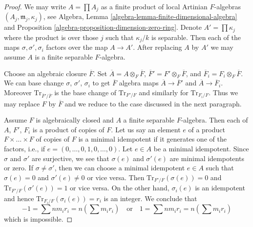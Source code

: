 \documentclass[10pt,a4paper]{amsart}
\theoremstyle{plain}
\theoremstyle{definition}
\theoremstyle{remark}
\numberwithin{equation}{subsection}
\begin{document}
\begin{proof}
We may write $A = \prod A_j$ as a finite product of
local Artinian $F$-algebras $(A_j, \mathfrak m_j, \kappa_j)$, see
Algebra, Lemma \ref{algebra-lemma-finite-dimensional-algebra} and
Proposition \ref{algebra-proposition-dimension-zero-ring}.
Denote $A' = \prod \kappa_j$ where the product is over those $j$
such that $\kappa_j/k$ is separable. Then each of the maps
$\sigma, \sigma', \sigma_i$ factors over the map
$A \to A'$. After replacing $A$ by $A'$ we may assume
$A$ is a finite separable $F$-algebra.

\medskip\noindent
Choose an algebraic closure $\overline{F}$. Set
$\overline{A} = A \otimes_F \overline{F}$,
$\overline{F}' = F' \otimes_F \overline{F}$, and
$\overline{F}_i = F_i \otimes_F \overline{F}$.
We can base change $\sigma$, $\sigma'$, $\sigma_i$
to get $\overline{F}$ algebra maps $\overline{A} \to \overline{F}'$
and $\overline{A} \to \overline{F}_i$. Moreover
$\text{Tr}_{\overline{F}'/\overline{F}}$ is the base
change of $\text{Tr}_{F'/F}$ and similarly for
$\text{Tr}_{F_i/F}$. Thus we may replace
$F$ by $\overline{F}$ and we reduce to the case discussed in
the next paragraph.

\medskip\noindent
Assume $F$ is algebraically closed and $A$ a finite separable $F$-algebra.
Then each of $A$, $F'$, $F_i$ is a product of copies of $F$.
Let us say an element $e$ of a product
$F \times \ldots \times F$ of copies of $F$ is a minimal idempotent
if it generates one of the factors, i.e., if
$e = (0, \ldots, 0, 1, 0, \ldots, 0)$. Let $e \in A$ be a minimal idempotent.
Since $\sigma$ and $\sigma'$ 
are surjective, we see that $\sigma(e)$ and $\sigma'(e)$ are minimal
idempotents or zero. If $\sigma \not = \sigma'$, then we can choose
a minimal idempotent $e \in A$ such that $\sigma(e) = 0$ and
$\sigma'(e) \not = 0$ or vice versa. Then
$\text{Tr}_{F'/F}(\sigma(e)) = 0$ and
$\text{Tr}_{F'/F}(\sigma'(e)) = 1$ or vice versa.
On the other hand, $\sigma_i(e)$ is an idempotent
and hence $\text{Tr}_{F_i/F}(\sigma_i(e)) = r_i$ is an integer.
We conclude that
$$
-1 = \sum n m_i r_i = n (\sum m_i r_i)
\quad\text{or}\quad
1 = \sum n m_i r_i = n (\sum m_i r_i)
$$
which is impossible.
\end{proof}
\end{document}
